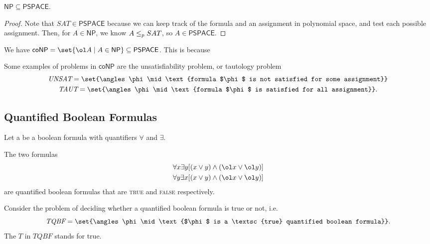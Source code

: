 \documentclass{standalone}
\begin{document}
\begin{theorem}
  \(\mathsf{NP} \subseteq \mathsf{PSPACE}\).
\end{theorem}
\begin{proof}
  Note that \(\textit{SAT} \in \mathsf{PSPACE}\) because we can keep track of the formula and an assignment in polynomial space, and test each possible assignment. Then, for \(A \in \mathsf{NP}\), we know \(A \mathrel{\leq_p} SAT\), so \(A \in \mathsf{PSPACE}\).
\end{proof}

\begin{example}
  We have \(\mathsf{coNP} = \set{\ol A \mid A \in \mathsf{NP}} \subseteq \mathsf{PSPACE}\). This is because 

  Some examples of problems in \(\mathsf{coNP}\) are the unsatisfiability problem, or tautology problem
  \begin{gather*}
    \textit{UNSAT} = \set{\angles \phi \mid \text{formula $\phi$ is not satisfied for some assignment}} \\
    \textit{TAUT} = \set{\angles \phi \mid \text{formula $\phi$ is satisfied for all assignment}}.
  \end{gather*}
\end{example}

\subsection{Quantified Boolean Formulas}
Let a  be a boolean formula with quantifiers \(\forall\) and \(\exists\).
\begin{example}
  The two formulas
  \begin{gather*}
    \forall x \exists y [(x \lor y) \land (\ol x \lor \ol y)] \\
    \forall y \exists x [(x \lor y) \land (\ol x \lor \ol y)]
  \end{gather*}
  are quantified boolean formulas that are \textsc{true} and \textsc{false} respectively.
\end{example}

Consider the problem of deciding whether a quantified boolean formula is true or not, i.e.
\[
  \textit{TQBF} = \set{\angles\phi \mid \text{$\phi$ is a \textsc{true} quantified boolean formula}}.
\]
The \(\textit{T}\) in \(\textit{TQBF}\) stands for true.
\end{document}
